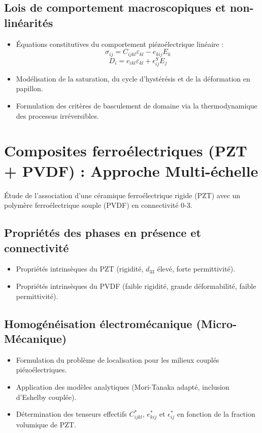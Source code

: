 \documentclass[12pt,a4paper]{article}
\begin{document}
\subsection{Lois de comportement macroscopiques et non-linéarités}
\begin{itemize}
    \item Équations constitutives du comportement piézoélectrique linéaire :
    $$\sigma_{ij} = C_{ijkl} \varepsilon_{kl} - e_{kij} E_k$$
    $$D_i = e_{ikl} \varepsilon_{kl} + \epsilon_{ij}^S E_j$$
    \item Modélisation de la saturation, du cycle d'hystérésis et de la déformation en papillon.
    \item Formulation des critères de basculement de domaine via la thermodynamique des processus irréversibles.
\end{itemize}

\section{Composites ferroélectriques (PZT + PVDF) : Approche Multi-échelle}

Étude de l'association d'une céramique ferroélectrique rigide (PZT) avec un polymère ferroélectrique souple (PVDF) en connectivité 0-3.

\subsection{Propriétés des phases en présence et connectivité}
\begin{itemize}
    \item Propriétés intrinsèques du PZT (rigidité, $d_{33}$ élevé, forte permittivité).
    \item Propriétés intrinsèques du PVDF (faible rigidité, grande déformabilité, faible permittivité).
\end{itemize}

\subsection{Homogénéisation électromécanique (Micro-Mécanique)}
\begin{itemize}
    \item Formulation du problème de localisation pour les milieux couplés piézoélectriques.
    \item Application des modèles analytiques (Mori-Tanaka adapté, inclusion d'Eshelby couplée).
    \item Détermination des tenseurs effectifs $C_{ijkl}^*$, $e_{kij}^*$ et $\epsilon_{ij}^*$ en fonction de la fraction volumique de PZT.
\end{itemize}
\end{document}
